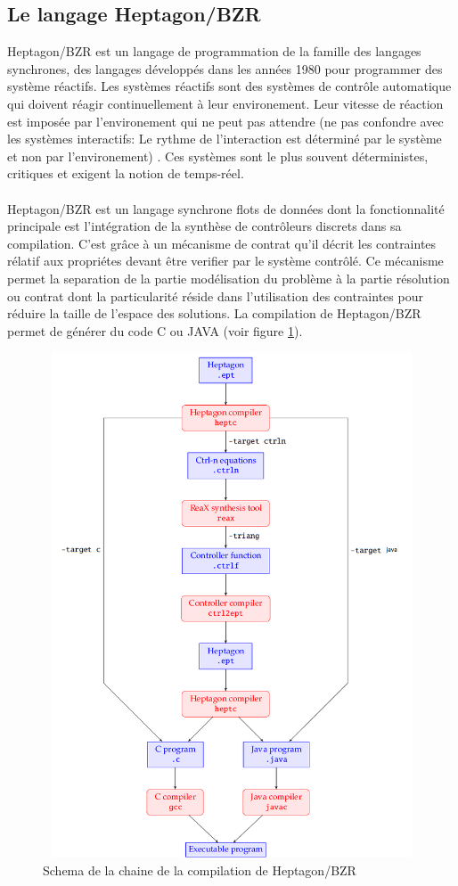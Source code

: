 \documentclass{svjour3}
\begin{document}
\subsection{Le langage Heptagon/BZR}
Heptagon/BZR \cite{ref6} \cite{ref7} est un langage de programmation de la famille des langages synchrones, des langages développés dans les années 1980 pour 
programmer des système réactifs. Les systèmes réactifs sont des systèmes de contrôle automatique qui doivent réagir continuellement à leur environement. 
Leur vitesse de réaction est imposée par l'environement qui ne peut pas attendre (ne pas confondre avec les 
systèmes interactifs: Le rythme de l'interaction est déterminé par le système et non par l'environement) \cite{ref5}. Ces systèmes sont le plus souvent 
déterministes, critiques et exigent la notion de temps-réel.
\\
\\
Heptagon/BZR est un langage synchrone flots de données dont la fonctionnalité principale est l'intégration de la synthèse de contrôleurs discrets dans sa 
compilation. C'est grâce à un mécanisme de contrat qu'il décrit les contraintes rélatif aux propriétes devant être verifier par
le système contrôlé. Ce mécanisme permet la separation de la partie modélisation du problème à la partie résolution ou contrat dont la particularité 
réside dans l'utilisation des contraintes pour réduire la taille de l'espace des solutions. La compilation de Heptagon/BZR permet de générer du code C ou JAVA (voir figure \ref{schemaCompile}).
\begin{figure}[!h]
 \includegraphics[height=15cm, width=15cm]{compilation.png}
 \caption{Schema de la chaine de la compilation de Heptagon/BZR}
 \label{schemaCompile}
\end{figure}
\end{document}
